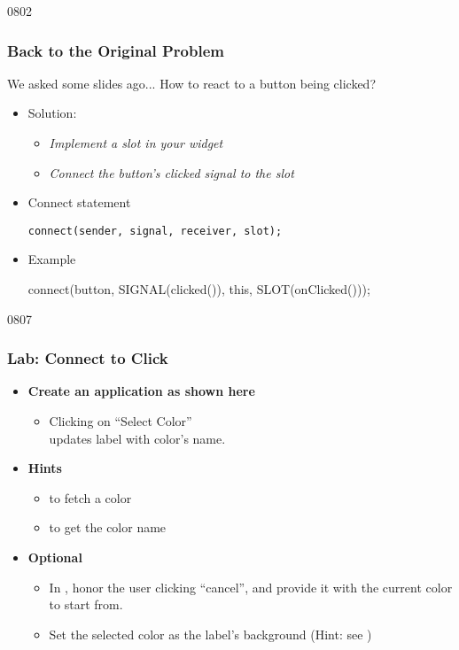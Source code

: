 \begin{slide}[fragile]{0802}\frametitle{Back to the Original Problem}
  \begin{block}{We asked some slides ago...}
    How to react to a button being clicked?
  \end{block}
\begin{itemize}
\item Solution:
  \begin{itemize}
  \item \emph{Implement a slot in your widget}
  \item \emph{Connect the button's clicked signal to the slot}
  \end{itemize}
\item Connect statement
\begin{lstlisting}
connect(sender, signal, receiver, slot);
\end{lstlisting}

\item Example
\begin{cpp}
connect(button, SIGNAL(clicked()), this, SLOT(onClicked()));
\end{cpp}
\end{itemize}
\end{slide}


\begin{slide}[fragile]{0807}
\frametitle{Lab: Connect to Click}
\label{project_signal_slot}
\begin{itemize}
\item \textbf{Create an application as shown here}
  \begin{itemize}
  \item Clicking on ``Select Color'' \\
    updates label with color's name.
  \end{itemize}
\item \textbf{Hints}
  \begin{itemize}
  \item {} to fetch a color
  \item {} to get the color name
 \end{itemize}
\item \textbf{Optional}
  \begin{itemize}
  \item In , honor the user clicking
    ``cancel'', and provide it with the current color to start from.
  \item Set the selected color as the label's background (Hint: see )
  \end{itemize}
\end{itemize}
\vfill
{}
\end{slide}

